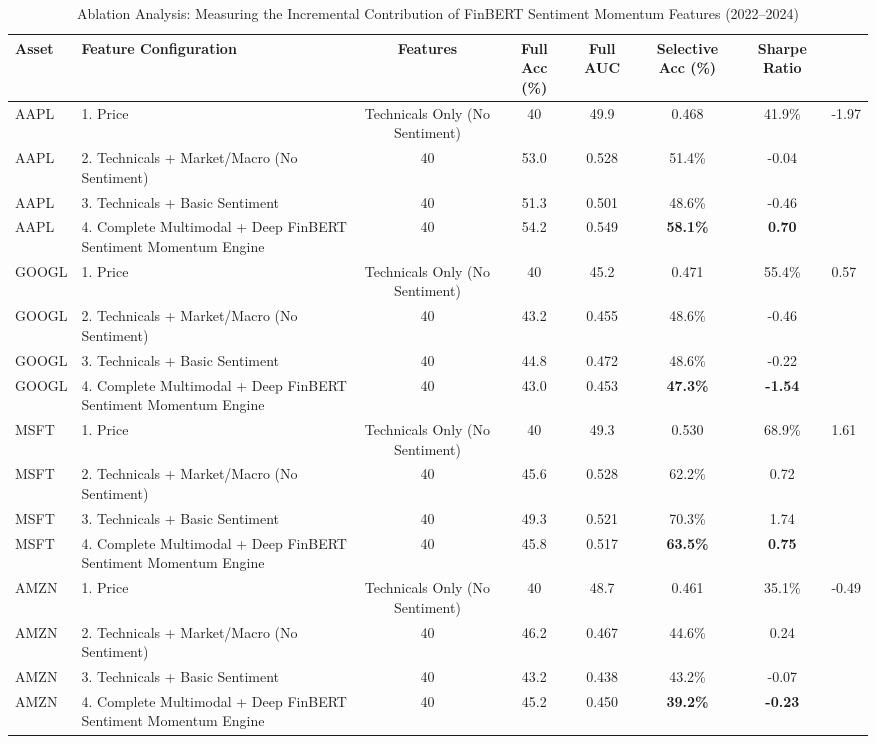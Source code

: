 \begin{table}[t]
\centering
\caption{Ablation Analysis: Measuring the Incremental Contribution of FinBERT Sentiment Momentum Features (2022--2024)}
\label{tab:sentiment_ablation}
\begin{tabular}{llccccc}
\hline
\textbf{Asset} & \textbf{Feature Configuration} & \textbf{Features} & \textbf{Full Acc (\%)} & \textbf{Full AUC} & \textbf{Selective Acc (\%)} & \textbf{Sharpe Ratio} \\
\hline
AAPL & 1. Price & Technicals Only (No Sentiment) & 40 & 49.9 & 0.468 & 41.9\% & -1.97 \\
AAPL & 2. Technicals + Market/Macro (No Sentiment) & 40 & 53.0 & 0.528 & 51.4\% & -0.04 \\
AAPL & 3. Technicals + Basic Sentiment & 40 & 51.3 & 0.501 & 48.6\% & -0.46 \\
AAPL & 4. Complete Multimodal + Deep FinBERT Sentiment Momentum Engine & 40 & 54.2 & 0.549 & \textbf{58.1\%} & \textbf{0.70} \\
GOOGL & 1. Price & Technicals Only (No Sentiment) & 40 & 45.2 & 0.471 & 55.4\% & 0.57 \\
GOOGL & 2. Technicals + Market/Macro (No Sentiment) & 40 & 43.2 & 0.455 & 48.6\% & -0.46 \\
GOOGL & 3. Technicals + Basic Sentiment & 40 & 44.8 & 0.472 & 48.6\% & -0.22 \\
GOOGL & 4. Complete Multimodal + Deep FinBERT Sentiment Momentum Engine & 40 & 43.0 & 0.453 & \textbf{47.3\%} & \textbf{-1.54} \\
MSFT & 1. Price & Technicals Only (No Sentiment) & 40 & 49.3 & 0.530 & 68.9\% & 1.61 \\
MSFT & 2. Technicals + Market/Macro (No Sentiment) & 40 & 45.6 & 0.528 & 62.2\% & 0.72 \\
MSFT & 3. Technicals + Basic Sentiment & 40 & 49.3 & 0.521 & 70.3\% & 1.74 \\
MSFT & 4. Complete Multimodal + Deep FinBERT Sentiment Momentum Engine & 40 & 45.8 & 0.517 & \textbf{63.5\%} & \textbf{0.75} \\
AMZN & 1. Price & Technicals Only (No Sentiment) & 40 & 48.7 & 0.461 & 35.1\% & -0.49 \\
AMZN & 2. Technicals + Market/Macro (No Sentiment) & 40 & 46.2 & 0.467 & 44.6\% & 0.24 \\
AMZN & 3. Technicals + Basic Sentiment & 40 & 43.2 & 0.438 & 43.2\% & -0.07 \\
AMZN & 4. Complete Multimodal + Deep FinBERT Sentiment Momentum Engine & 40 & 45.2 & 0.450 & \textbf{39.2\%} & \textbf{-0.23} \\
\hline
\end{tabular}
\end{table}